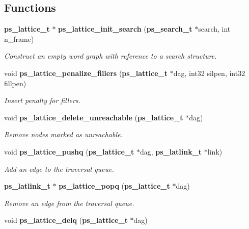 \subsection*{Functions}
\begin{DoxyCompactItemize}
\item 
{\bf ps\-\_\-lattice\-\_\-t} $\ast$ {\bf ps\-\_\-lattice\-\_\-init\-\_\-search} ({\bf ps\-\_\-search\-\_\-t} $\ast$search, int n\-\_\-frame)\label{ps__lattice__internal_8h_a606f6ee0fd569dd5829d7f84ae7e61bd}

\begin{DoxyCompactList}\small\item\em Construct an empty word graph with reference to a search structure. \end{DoxyCompactList}\item 
void {\bf ps\-\_\-lattice\-\_\-penalize\-\_\-fillers} ({\bf ps\-\_\-lattice\-\_\-t} $\ast$dag, int32 silpen, int32 fillpen)\label{ps__lattice__internal_8h_a551b8246b45e8953491a24db438c59c1}

\begin{DoxyCompactList}\small\item\em Insert penalty for fillers. \end{DoxyCompactList}\item 
void {\bf ps\-\_\-lattice\-\_\-delete\-\_\-unreachable} ({\bf ps\-\_\-lattice\-\_\-t} $\ast$dag)\label{ps__lattice__internal_8h_a6da4e36322aaab4d2ebe812bee9a4439}

\begin{DoxyCompactList}\small\item\em Remove nodes marked as unreachable. \end{DoxyCompactList}\item 
void {\bf ps\-\_\-lattice\-\_\-pushq} ({\bf ps\-\_\-lattice\-\_\-t} $\ast$dag, {\bf ps\-\_\-latlink\-\_\-t} $\ast$link)\label{ps__lattice__internal_8h_a04896ebe0e2592bc7950d413b5d5c52e}

\begin{DoxyCompactList}\small\item\em Add an edge to the traversal queue. \end{DoxyCompactList}\item 
{\bf ps\-\_\-latlink\-\_\-t} $\ast$ {\bf ps\-\_\-lattice\-\_\-popq} ({\bf ps\-\_\-lattice\-\_\-t} $\ast$dag)\label{ps__lattice__internal_8h_a481c4d941368597e11b0af4709bd03b0}

\begin{DoxyCompactList}\small\item\em Remove an edge from the traversal queue. \end{DoxyCompactList}\item 
void {\bf ps\-\_\-lattice\-\_\-delq} ({\bf ps\-\_\-lattice\-\_\-t} $\ast$dag)\label{ps__lattice__internal_8h_ad128ca75e8bc7ca4ba41094fb5b68ee9}


\end{DoxyCompactItemize}
